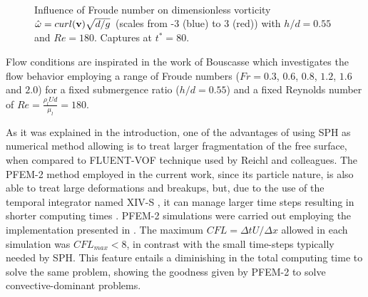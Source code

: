 \begin{figure}[htbp]
\begin{center}
{    } \\
 \\
 \\
  \end{center}
  \caption{Influence of Froude number on dimensionless vorticity $\hat\omega = curl(\mathbf{v}) \sqrt{d/g}$ (scales from -3 (blue) to 3 (red)) with $h/d = 0.55$ and $Re=180$. Captures at $t^*=80$.
}
\label{fg:vort_Re180}
\end{figure}

Flow conditions are inspirated in the work of Bouscasse \cite{Bouscasse14} which investigates the flow behavior employing a range of Froude numbers ($Fr=0.3$, $0.6$, $0.8$, $1.2$, $1.6$ and $2.0$) for a fixed submergence ratio ($h/d=0.55$) and a fixed Reynolds number of $Re=\frac{\rho_l U d}{\mu_l}=180$.

As it was explained in the introduction, one of the advantages of using SPH as numerical method allowing is to treat larger fragmentation of the free surface, when compared to FLUENT-VOF technique used by Reichl and colleagues. The PFEM-2 method employed in the current work, since its particle nature, is also able to treat large deformations and breakups, but, due to the use of the temporal integrator named XIV-S \cite{Idelsohn12}, it can manage larger time steps resulting in shorter computing times \cite{Gimenez2015186}. PFEM-2 simulations were carried out employing the implementation presented in \cite{Gimenez14}. The maximum $CFL=\Delta t U/\Delta x$ allowed in each simulation was $CFL_{max}<8$, in contrast with the small time-steps typically needed by SPH. This feature entails a diminishing in the total computing time to solve the same problem, showing the goodness given by PFEM-2 to solve convective-dominant problems.

